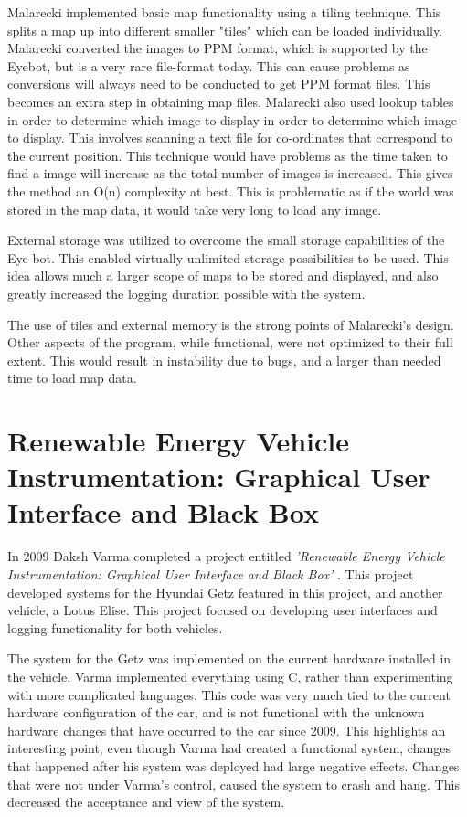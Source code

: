 Malarecki implemented basic map functionality using a tiling technique. This splits a map up into different smaller "tiles" which can be loaded individually. Malarecki converted the images to PPM format, which is supported by the Eyebot, but is a very rare file-format today. This can cause problems as conversions will always need to be conducted to get PPM format files. This becomes an extra step in obtaining map files. Malarecki also used lookup tables in order to determine which image to display in order to determine which image to display. This involves scanning a text file for co-ordinates that correspond to the current position. This technique would have problems as the time taken to find a image will increase as the total number of images is increased. This gives the method an O(n) complexity at best. This is problematic as if the world was stored in the map data, it would take very long to load any image.

External storage was utilized to overcome the small storage capabilities of the Eye-bot. This enabled virtually unlimited storage possibilities to be used. This idea allows much a larger scope of maps to be stored and displayed, and also greatly increased the logging duration possible with the system.

The use of tiles and external memory is the strong points of Malarecki's design. Other aspects of the program, while functional, were not optimized to their full extent. This would result in instability due to bugs, and a larger than needed time to load map data.


\section{Renewable Energy Vehicle Instrumentation:
Graphical User Interface and Black Box}

In 2009 Daksh Varma completed a project entitled \emph{'Renewable Energy Vehicle Instrumentation:
Graphical User Interface and Black Box'} \cite{thesis_varma}. This project developed systems for the Hyundai Getz featured in this project, and another vehicle, a Lotus Elise. This project focused on developing user interfaces and logging functionality for both vehicles.

The system for the Getz was implemented on the current hardware installed in the vehicle. Varma implemented everything using C, rather than experimenting with more complicated languages. This code was very much tied to the current hardware configuration of the car, and is not functional with the unknown hardware changes that have occurred to the car since 2009. This highlights an interesting point, even though Varma had created a functional system, changes that happened after his system was deployed had large negative effects. Changes that were not under Varma's control, caused the system to crash and hang. This decreased the acceptance and view of the system.

